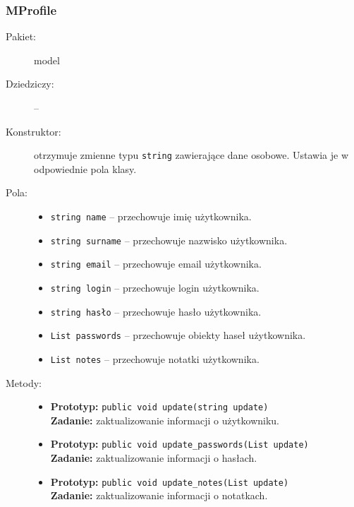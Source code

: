 \documentclass[a4paper]{article}
\newcommand{\prog}{\texttt}
\begin{document}
\subsubsection{MProfile}
\begin{description}
    \item[Pakiet:] model
    \item[Dziedziczy:] --
    \item[Konstruktor:] otrzymuje zmienne typu \prog{string} zawierające dane osobowe. Ustawia je w odpowiednie pola klasy.
    \item[Pola:] \hfill
    \begin{itemize}
        \item \prog{string name} -- przechowuje imię użytkownika.
        \item \prog{string surname} -- przechowuje nazwisko użytkownika.
        \item \prog{string email} -- przechowuje email użytkownika.
        \item \prog{string login} -- przechowuje login użytkownika.
        \item \prog{string hasło} -- przechowuje hasło użytkownika.
        \item \prog{List passwords} -- przechowuje obiekty haseł użytkownika.
        \item \prog{List notes} -- przechowuje notatki użytkownika.
    \end{itemize}
    \item[Metody:] \hfill
    \begin{itemize}
        \item \textbf{Prototyp:} \prog{public void update(string update)}\\\textbf{Zadanie:} zaktualizowanie informacji o użytkowniku.
        \item \textbf{Prototyp:} \prog{public void update\_passwords(List update)}\\\textbf{Zadanie:} zaktualizowanie informacji o hasłach.
        \item \textbf{Prototyp:} \prog{public void update\_notes(List update)}\\\textbf{Zadanie:} zaktualizowanie informacji o notatkach.
    \end{itemize}
\end{description}
\end{document}
